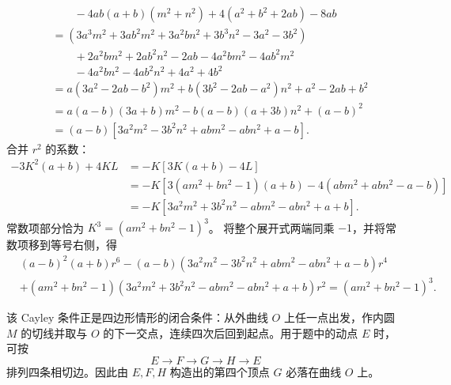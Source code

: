 \begin{solution}
\begin{align*}
&\qquad - 4ab(a+b)(m^2+n^2) + 4(a^2+b^2+2ab) - 8ab \\
&= (3a^3m^2 + 3ab^2m^2 + 3a^2bn^2 + 3b^3n^2 - 3a^2 - 3b^2) \\
&\qquad + 2a^2bm^2 + 2ab^2n^2 - 2ab - 4a^2bm^2 - 4ab^2m^2 \\
&\qquad - 4a^2bn^2 - 4ab^2n^2 + 4a^2 + 4b^2 \\
&= a(3a^2 - 2ab - b^2)m^2 + b(3b^2 - 2ab - a^2)n^2 + a^2 - 2ab + b^2 \\
&= a(a-b)(3a+b)m^2 - b(a-b)(a+3b)n^2 + (a-b)^2 \\
&= (a-b) \left[ 3a^2m^2 - 3b^2n^2 + abm^2 - abn^2 + a - b \right].
\end{align*}
合并 $r^2$ 的系数：
\begin{align*}
-3K^2(a+b) + 4KL &= -K \left[ 3K(a+b) - 4L \right] \\
&= -K \left[ 3(am^2+bn^2-1)(a+b) - 4(abm^2+abn^2-a-b) \right] \\
&= -K \left[ 3a^2m^2 + 3b^2n^2 - abm^2 - abn^2 + a + b \right].
\end{align*}
常数项部分恰为 $K^3 = (am^2+bn^2-1)^3$。
将整个展开式两端同乘 $-1$，并将常数项移到等号右侧，得
\[
\begin{aligned}
&(a - b)^2(a + b)r^6 - (a - b)(3a^2 m^2 - 3b^2 n^2 + abm^2 - abn^2 + a - b)r^4 \\
&+ (am^2 + bn^2 - 1)(3a^2 m^2 + 3b^2 n^2 - abm^2 - abn^2 + a + b)r^2 = (am^2 + bn^2 - 1)^3.
\end{aligned}
\]

该 Cayley 条件正是四边形情形的闭合条件：从外曲线 $O$ 上任一点出发，作内圆 $M$ 的切线并取与 $O$ 的下一交点，连续四次后回到起点。用于题中的动点 $E$ 时，可按
\[
E\longrightarrow F\longrightarrow G\longrightarrow H\longrightarrow E
\]
排列四条相切边。因此由 $E,F,H$ 构造出的第四个顶点 $G$ 必落在曲线 $O$ 上。


\end{solution}
